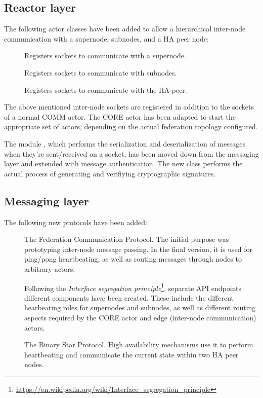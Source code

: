 \subsection{Reactor layer}
The following actor classes have been added to allow a hierarchical inter-node
communication with a supernode, subnodes, and a HA peer node:
\begin{description}
	\item [] Registers sockets to communicate with a supernode.
	\item [] Registers sockets to communicate with subnodes.
	\item [] Registers sockets to communicate with the \gls{HA} peer.
\end{description}
The above mentioned inter-node sockets are registered in addition to the sockets of a normal COMM actor.
The CORE actor  has been adapted to start the
appropriate set of actors, depending on the actual federation topology
configured.

The module , which performs the serialization and
deserialization of messages when they're sent/received on a socket, has been
moved down from the messaging layer and extended with message authentication.
The new class  performs the actual
process of generating and verifiying cryptographic signatures.

\subsection{Messaging layer}
The following new protocols have been added:
\begin{description}
	\item [] The Federation Communication
		Protocol. The initial purpose was prototyping inter-node
		message passing. In the final version, it is used for ping/pong
		heartbeating, as well as routing messages through nodes to
		arbitrary actors.

		Following the \emph{Interface segregation
		principle}\footnote{\url{https://en.wikipedia.org/wiki/Interface_segregation_principle}},
		separate API endpoints different components have been created.
		These include the different hearbeating roles for supernodes
		and subnodes, as well as different routing aspects required by
		the CORE actor and edge (inter-node communication) actors.

	\item [] The Binary Star Protocol. High
		availability mechanisms use it to perform heartbeating and
		communicate the current state within two HA peer nodes.

\end{description}

